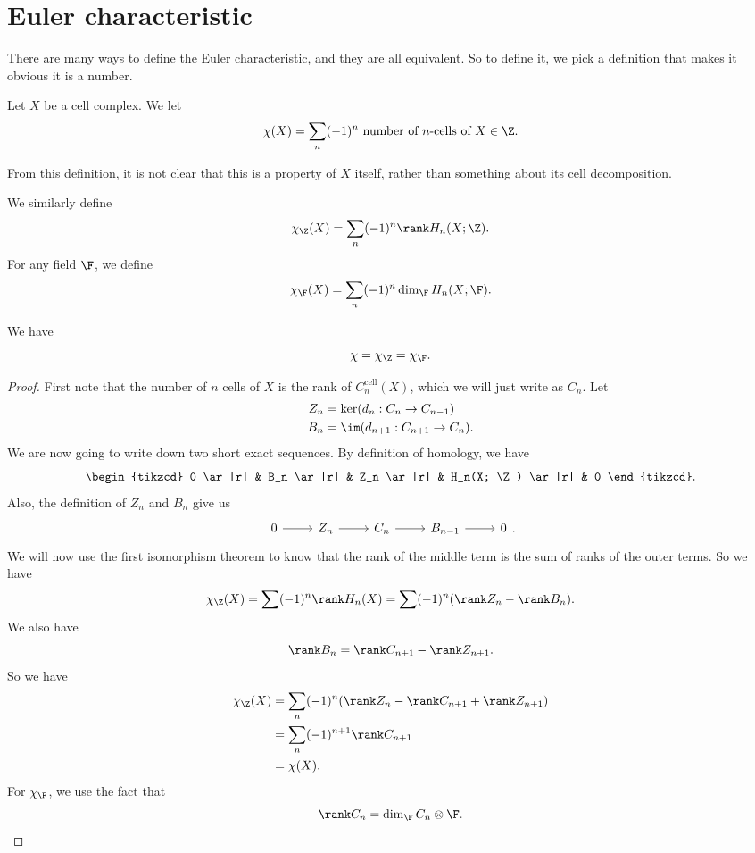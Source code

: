 \documentclass[a4paper]{article}
\begin{document}
\section{Euler characteristic}
There are many ways to define the Euler characteristic, and they are all equivalent. So to define it, we pick a definition that makes it obvious it is a number.
\begin{defi}
  Let $X$ be a cell complex. We let
  \[
    \chi(X) = \sum_n (-1)^n \text{ number of $n$-cells of $X$} \in \Z.
  \]
\end{defi}
From this definition, it is not clear that this is a property of $X$ itself, rather than something about its cell decomposition.

We similarly define
\[
  \chi_{\Z}(X) = \sum_n (-1)^n \rank H_n(X; \Z).
\]
For any field $\F$, we define
\[
  \chi_{\F}(X) = \sum_n (-1)^n \dim_\F H_n(X; \F).
\]
\begin{thm}
  We have
  \[
    \chi = \chi_\Z = \chi_\F.
  \]
\end{thm}

\begin{proof}
  First note that the number of $n$ cells of $X$ is the rank of $C_n^{\mathrm{cell}}(X)$, which we will just write as $C_n$. Let
  \begin{align*}
    Z_n &= \ker (d_n: C_n \to C_{n - 1})\\
    B_n &= \im (d_{n + 1}: C_{n + 1} \to C_n).
  \end{align*}
  We are now going to write down two short exact sequences. By definition of homology, we have
  \[
    \begin{tikzcd}
      0 \ar[r] & B_n \ar[r] & Z_n \ar[r] & H_n(X; \Z) \ar[r] & 0
    \end{tikzcd}.
  \]
  Also, the definition of $Z_n$ and $B_n$ give us
  \[
    \begin{tikzcd}
      0 \ar[r] & Z_n \ar[r] & C_n \ar[r] & B_{n - 1} \ar[r] & 0
    \end{tikzcd}.
  \]
  We will now use the first isomorphism theorem to know that the rank of the middle term is the sum of ranks of the outer terms. So we have
  \[
    \chi_\Z(X) = \sum (-1)^n \rank H_n(X) = \sum(-1)^n (\rank Z_n - \rank B_n).
  \]
  We also have
  \[
    \rank B_n = \rank C_{n + 1} - \rank Z_{n + 1}.
  \]
  So we have
  \begin{align*}
    \chi_\Z(X) &= \sum_n (-1)^n (\rank Z_n - \rank C_{n + 1} + \rank Z_{n + 1}) \\
    &= \sum_n (-1)^{n + 1} \rank C_{n + 1}\\
    &= \chi(X).
  \end{align*}
  For $\chi_\F$, we use the fact that
  \[
    \rank C_n = \dim_{\F} C_n \otimes \F.
  \]
\end{proof}
\end{document}
